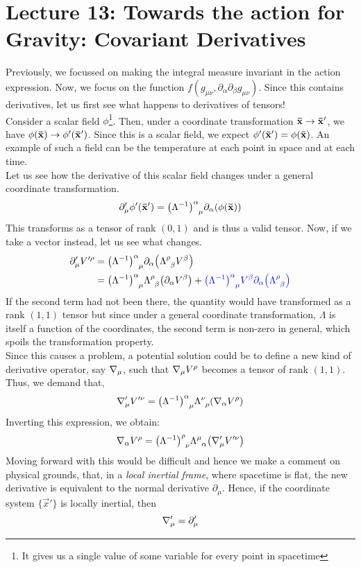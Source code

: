\section*{Lecture 13: Towards the action for Gravity: Covariant Derivatives}
Previously, we focussed on making the integral measure invariant in the action expression. Now, we focus on the function $f(g_{\mu\nu}, \partial_\alpha\partial_\beta g_{\mu\nu})$. Since this contains derivatives, let us first see what happens to derivatives of tensors!\\[0.2cm]
Consider a scalar field $\phi$\footnote{ It gives us a single value of some variable for every point in
spacetime}. Then, under a coordinate transformation $\vb{\bar{x}}\rightarrow \vb{\bar{x}}'$, we have $\phi(\vb{\bar{x}})\rightarrow \phi'(\vb{\bar{x}}')$. Since this is a scalar field, we expect $\phi'(\vb{\bar{x}}') = \phi(\vb{\bar{x}})$. An example of such a field can be the temperature at each point in space and at each time. \\[0.2cm]
Let us see how the derivative of this scalar field changes under a general coordinate transformation. 
$$\partial'_\mu \phi'(\fvec{x}') = \itrmat{\alpha}{\mu} \partial_\alpha (\phi(\fvec{x}))$$
This transforms as a tensor of rank $(0,1)$ and is thus a valid tensor. Now, if we take a vector instead, let us see what changes.
\begin{align*}
    \partial'_\mu V'^\rho &= \itrmat{\alpha}{\mu} \partial_\alpha \qty(\trmat{\rho}{\beta}V^\beta)\\
    &=\itrmat{\alpha}{\mu} \trmat{\rho}{\beta} \qty(\partial_\alpha V^\beta) + \mathcolor{blue}{\itrmat{\alpha}{\mu}V^\beta\partial_\alpha\qty(\trmat{\rho}{\beta})}
\end{align*}
If the second term had not been there, the quantity would have transformed as a rank $(1,1)$ tensor but since under a general coordinate transformation, $\Lambda$ is itself a function of the coordinates, the second term is non-zero in general, which spoils the transformation property.\\[0.2cm]
Since this causes a problem, a potential solution could be to define a new kind of derivative operator, say $\nabla_{\mu}$, such that $\nabla_{\mu}V^\rho$ becomes a tensor of rank $(1,1)$. Thus, we demand that,
$$\covd{\mu}'V'^\nu = \itrmat{\alpha}{\mu}\trmat{\nu}{\rho}\qty(\covd{\alpha}V^\rho)$$
Inverting this expression, we obtain:
\begin{align}\label{eqn:coder}
    \covd{\alpha}V^\rho = \itrmat{\rho}{\nu}\trmat{\mu}{\alpha} \qty(\covd{\mu}'V'^\nu)
\end{align}
Moving forward with this would be difficult and hence we make a comment on physical grounds, that, in a \textit{local inertial frame}, where spacetime is flat, the new derivative is equivalent to the normal derivative $\partial_\mu$. Hence, if the coordinate system $\{\vec{x}'\}$ is locally inertial, then $$\nabla_{\mu}' = \partial_\mu'$$

